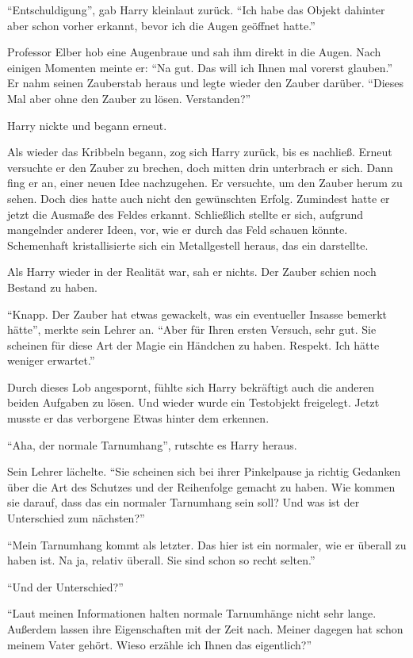 \enquote{Entschuldigung}, gab Harry kleinlaut zurück. \enquote{Ich habe das Objekt dahinter aber schon vorher erkannt, bevor ich die Augen geöffnet hatte.}

Professor Elber hob eine Augenbraue und sah ihm direkt in die Augen. Nach einigen Momenten meinte er: \enquote{Na gut. Das will ich Ihnen mal vorerst glauben.} Er nahm seinen Zauberstab heraus und legte wieder den Zauber darüber. \enquote{Dieses Mal aber ohne den Zauber zu lösen. Verstanden?}

Harry nickte und begann erneut.

Als wieder das Kribbeln begann, zog sich Harry zurück, bis es nachließ. Erneut versuchte er den Zauber zu brechen, doch mitten drin unterbrach er sich. Dann fing er an, einer neuen Idee nachzugehen. Er versuchte, um den Zauber herum zu sehen. Doch dies hatte auch nicht den gewünschten Erfolg. Zumindest hatte er jetzt die Ausmaße des Feldes erkannt. Schließlich stellte er sich, aufgrund mangelnder anderer Ideen, vor, wie er durch das Feld schauen könnte. Schemenhaft kristallisierte sich ein Metallgestell heraus, das ein  darstellte.

Als Harry wieder in der Realität war, sah er nichts. Der Zauber schien noch Bestand zu haben.

\enquote{Knapp. Der Zauber hat etwas gewackelt, was ein eventueller Insasse bemerkt hätte}, merkte sein Lehrer an. \enquote{Aber für Ihren ersten Versuch, sehr gut. Sie scheinen für diese Art der Magie ein Händchen zu haben. Respekt. Ich hätte weniger erwartet.}

Durch dieses Lob angespornt, fühlte sich Harry bekräftigt auch die anderen beiden Aufgaben zu lösen. Und wieder wurde ein Testobjekt freigelegt. Jetzt musste er das verborgene Etwas hinter dem  erkennen.

\enquote{Aha, der normale Tarnumhang}, rutschte es Harry heraus.

Sein Lehrer lächelte. \enquote{Sie scheinen sich bei ihrer Pinkelpause ja richtig Gedanken über die Art des Schutzes und der Reihenfolge gemacht zu haben. Wie kommen sie darauf, dass das ein normaler Tarnumhang sein soll? Und was ist der Unterschied zum nächsten?}

\enquote{Mein Tarnumhang kommt als letzter. Das hier ist ein normaler, wie er überall zu haben ist. Na ja, relativ überall. Sie sind schon so recht selten.}

\enquote{Und der Unterschied?}

\enquote{Laut meinen Informationen halten normale Tarnumhänge nicht sehr lange. Außerdem lassen ihre Eigenschaften mit der Zeit nach. Meiner dagegen hat schon meinem Vater gehört. \gst Wieso erzähle ich Ihnen das eigentlich?}

